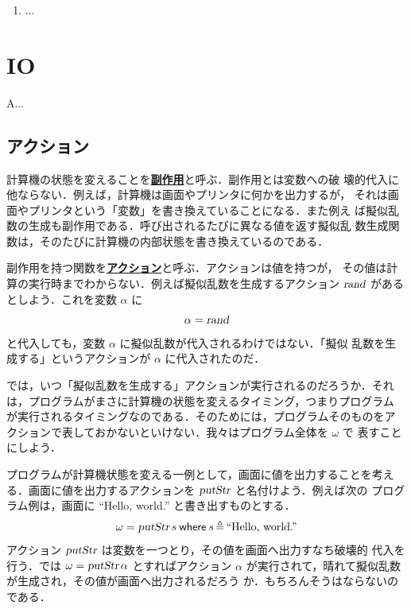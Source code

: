 \documentclass[a5paper,twoside,fleqn,draft]{jsbook}
\newcommand{\keyword}[1]{{\underline{\textbf{#1}}}}
\newcommand{\mKeyword}[1]{\mathsf{#1}}
\newcommand{\mWhereKeyword}{\mKeyword{where}}
\newcommand{\mString}[1]{\text{#1}}
\newcommand{\mAction}[1]{\textsl{#1}}
\DeclareMathOperator{\mPutStr}{\mAction{putStr}}
\DeclareMathOperator{\mRand}{\mAction{rand}}
\DeclareMathOperator{\mLetEq}{\triangleq}
\newcommand{\mWhereIsEXP}[2]{\mathbin{\mWhereKeyword}#1\mLetEq#2} %
\begin{document}
\begin{enumerate}
\item ...
\end{enumerate}


\chapter{IO}
\label{ch:io}

A...

\section{アクション}

計算機の状態を変えることを\keyword{副作用}と呼ぶ．副作用とは変数への破
壊的代入に他ならない．例えば，計算機は画面やプリンタに何かを出力するが，
それは画面やプリンタという「変数」を書き換えていることになる．また例え
ば擬似乱数の生成も副作用である．呼び出されるたびに異なる値を返す擬似乱
数生成関数は，そのたびに計算機の内部状態を書き換えているのである．

副作用を持つ関数を\keyword{アクション}と呼ぶ．アクションは値を持つが，
その値は計算の実行時までわからない．例えば擬似乱数を生成するアクション
$\mRand$ があるとしよう．これを変数 $\alpha$ に
\begin{equation}
\alpha=\mRand
\end{equation}
と代入しても，変数 $\alpha$ に擬似乱数が代入されるわけではない．「擬似
  乱数を生成する」というアクションが $\alpha$ に代入されたのだ．

では，いつ「擬似乱数を生成する」アクションが実行されるのだろうか．それ
は，プログラムがまさに計算機の状態を変えるタイミング，つまりプログラム
が実行されるタイミングなのである．そのためには，プログラムそのものをア
クションで表しておかないといけない．我々はプログラム全体を $\omega$ で
表すことにしよう．

プログラムが計算機状態を変える一例として，画面に値を出力することを考え
る．画面に値を出力するアクションを $\mPutStr$ と名付けよう．例えば次の
プログラム例は，画面に ``Hello, world.'' と書き出すものとする．
\begin{equation}
\omega=\mPutStr s\mWhereIsEXP{s}{\mString{``Hello, world.''}}
\end{equation}
アクション $\mPutStr$ は変数を一つとり，その値を画面へ出力すなち破壊的
代入を行う．では $\omega=\mPutStr\alpha$ とすればアクション $\alpha$
が実行されて，晴れて擬似乱数が生成され，その値が画面へ出力されるだろう
か．もちろんそうはならないのである．
\end{document}
